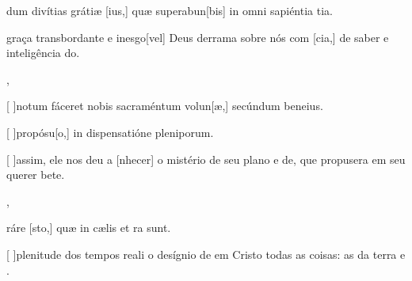 {  {\item {}dum divítias grátiæ [ius,] quæ superabun[bis] in omni sapiéntia tia.~\Antiphona}%
    {\item {} graça transbordante e inesgo[vel] Deus derrama sobre nós com [cia,] de saber e inteligência do.~\Antiphona},
  {\item {}[ ]{no}tum fáceret nobis sacraméntum volun[æ,] secúndum beneius.~\Antiphona
      \item {}[ ]{pro}pósu[o,] in dispensatióne pleniporum.}%
    {\item {}[ ]{as}sim, ele nos deu a [nhecer] o mistério de seu plano e de, que propusera em seu querer bete.~\Antiphona},
  {\item {}ráre [sto,] quæ in cælis et ra sunt.~\Antiphona}%
    {\item {}[ ]{ple}nitude dos tempos reali o desígnio de em Cristo  todas as coisas: as da terra e .~\Antiphona}
}